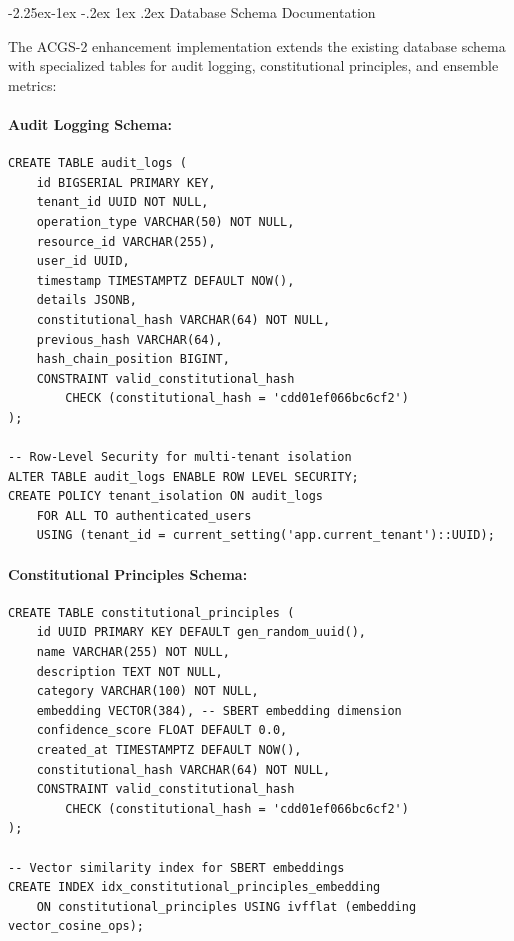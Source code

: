 \documentclass[manuscript,screen,9pt]{acmart}
\makeatletter
\renewcommand\subsection{\@startsection{subsection}{2}{\z@}%
  {-2.25ex\@plus -1ex \@minus -.2ex}%
  {1ex \@plus .2ex}%
  {\normalfont\large\bfseries}}
\makeatother
\begin{document}
\subsection{Database Schema Documentation}
\label{app:database_schema}

The ACGS-2 enhancement implementation extends the existing database schema with specialized tables for audit logging, constitutional principles, and ensemble metrics:

\paragraph{Audit Logging Schema:}
\begin{verbatim}
CREATE TABLE audit_logs (
    id BIGSERIAL PRIMARY KEY,
    tenant_id UUID NOT NULL,
    operation_type VARCHAR(50) NOT NULL,
    resource_id VARCHAR(255),
    user_id UUID,
    timestamp TIMESTAMPTZ DEFAULT NOW(),
    details JSONB,
    constitutional_hash VARCHAR(64) NOT NULL,
    previous_hash VARCHAR(64),
    hash_chain_position BIGINT,
    CONSTRAINT valid_constitutional_hash
        CHECK (constitutional_hash = 'cdd01ef066bc6cf2')
);

-- Row-Level Security for multi-tenant isolation
ALTER TABLE audit_logs ENABLE ROW LEVEL SECURITY;
CREATE POLICY tenant_isolation ON audit_logs
    FOR ALL TO authenticated_users
    USING (tenant_id = current_setting('app.current_tenant')::UUID);
\end{verbatim}

\paragraph{Constitutional Principles Schema:}
\begin{verbatim}
CREATE TABLE constitutional_principles (
    id UUID PRIMARY KEY DEFAULT gen_random_uuid(),
    name VARCHAR(255) NOT NULL,
    description TEXT NOT NULL,
    category VARCHAR(100) NOT NULL,
    embedding VECTOR(384), -- SBERT embedding dimension
    confidence_score FLOAT DEFAULT 0.0,
    created_at TIMESTAMPTZ DEFAULT NOW(),
    constitutional_hash VARCHAR(64) NOT NULL,
    CONSTRAINT valid_constitutional_hash
        CHECK (constitutional_hash = 'cdd01ef066bc6cf2')
);

-- Vector similarity index for SBERT embeddings
CREATE INDEX idx_constitutional_principles_embedding
    ON constitutional_principles USING ivfflat (embedding vector_cosine_ops);
\end{verbatim}
\end{document}
